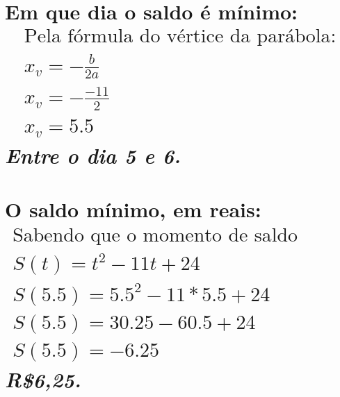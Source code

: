\documentclass{jhwhw}
\begin{document}
\part{
	Em que dia o saldo é mínimo:
	\begin{multline*}
		\text{Pela fórmula do vértice da parábola:}
		\\x_v = -\frac{b}{2a} \\
		x_v = -\frac{-11}{2} \\
		x_v = 5.5
	\end{multline*}
	\emph{Entre o dia 5 e 6.}
}
\part{
	O saldo mínimo, em reais:
	\begin{multline*}
		\text{Sabendo que o momento de saldo mínimo é 5.5: }\\
		S(t) = t^{2} - 11t + 24 \\
		S(5.5) = 5.5^{2} - 11*5.5 + 24 \\
		S(5.5) = 30.25 - 60.5 + 24 \\
		S(5.5) = -6.25
	\end{multline*}
	\emph{R\$6,25.}
}
\end{document}
